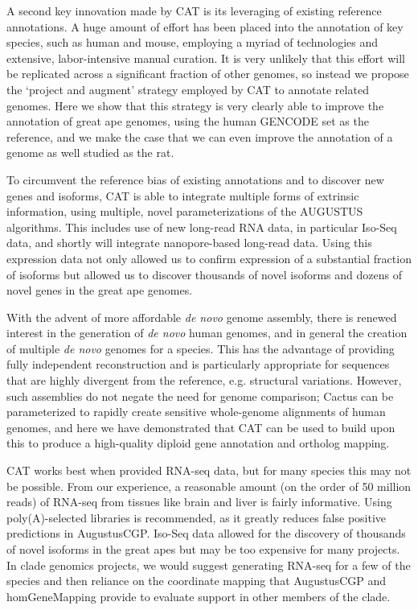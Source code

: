 \documentclass[fleqn,10pt]{wlscirep}
\begin{document}
A second key innovation made by CAT is its leveraging of existing reference annotations. A huge amount of effort has been placed into the annotation of key species, such as human and mouse, employing a myriad of technologies and extensive, labor-intensive manual curation. It is very unlikely that this effort will be replicated across a significant fraction of other genomes, so instead we propose the `project and augment' strategy employed by CAT to annotate related genomes. Here we show that this strategy is very clearly able to improve the annotation of great ape genomes, using the human GENCODE set as the reference, and we make the case that we can even improve the annotation of a genome as well studied as the rat. 

To circumvent the reference bias of existing annotations and to discover new genes and isoforms, CAT is able to integrate multiple forms of extrinsic information, using multiple, novel parameterizations of the AUGUSTUS algorithms. This includes use of new long-read RNA data, in particular Iso-Seq data, and shortly will integrate nanopore-based long-read data\cite{byrne2017nanopore}. Using this expression data not only allowed us to confirm expression of a substantial fraction of isoforms but allowed us to discover thousands of novel isoforms and dozens of novel genes in the great ape genomes.

With the advent of more affordable \textit{de novo} genome assembly, there is renewed interest in the generation of \textit{de novo} human genomes, and in general the creation of multiple \textit{de novo} genomes for a species. This has the advantage of providing fully independent reconstruction and is particularly appropriate for sequences that are highly divergent from the reference, e.g. structural variations. However, such assemblies do not negate the need for genome comparison; Cactus can be parameterized to rapidly create sensitive whole-genome alignments of human genomes, and here we have demonstrated that CAT can be used to build upon this to produce a high-quality diploid gene annotation and ortholog mapping. 

CAT works best when provided RNA-seq data, but for many species this may not be possible. From our experience, a reasonable amount (on the order of 50 million reads) of RNA-seq from tissues like brain and liver is fairly informative. Using poly(A)-selected libraries is recommended, as it greatly reduces false positive predictions in AugustusCGP. Iso-Seq data allowed for the discovery of thousands of novel isoforms in the great apes but may be too expensive for many projects. In clade genomics projects, we would suggest generating RNA-seq for a few of the species and then reliance on the coordinate mapping that AugustusCGP and homGeneMapping provide to evaluate support in other members of the clade. 
\end{document}
